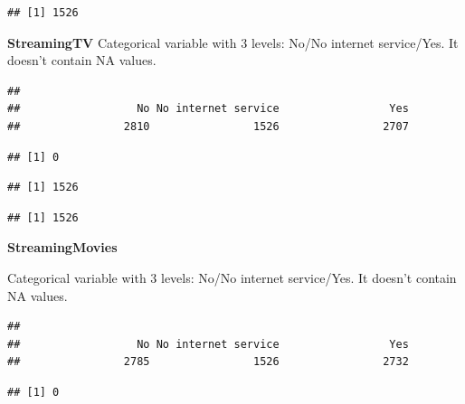 \documentclass[
  twoside]{article}
\newenvironment{Shaded}{\begin{snugshade}}{\end{snugshade}}
\newcommand{\CommentTok}[1]{\textcolor[rgb]{0.56,0.35,0.01}{\textit{#1}}}
\newcommand{\FunctionTok}[1]{\textcolor[rgb]{0.13,0.29,0.53}{\textbf{#1}}}
\newcommand{\NormalTok}[1]{#1}
\newcommand{\SpecialCharTok}[1]{\textcolor[rgb]{0.81,0.36,0.00}{\textbf{#1}}}
\newcommand{\StringTok}[1]{\textcolor[rgb]{0.31,0.60,0.02}{#1}}
\begin{document}
\begin{verbatim}
## [1] 1526
\end{verbatim}

\textbf{StreamingTV} Categorical variable with 3 levels: No/No internet
service/Yes. It doesn't contain NA values.

\begin{verbatim}
## 
##                  No No internet service                 Yes 
##                2810                1526                2707
\end{verbatim}

\begin{verbatim}
## [1] 0
\end{verbatim}

\begin{Shaded}
\end{Shaded}

\begin{verbatim}
## [1] 1526
\end{verbatim}

\begin{Shaded}
\end{Shaded}

\begin{verbatim}
## [1] 1526
\end{verbatim}

\textbf{StreamingMovies}

Categorical variable with 3 levels: No/No internet service/Yes. It
doesn't contain NA values.

\begin{verbatim}
## 
##                  No No internet service                 Yes 
##                2785                1526                2732
\end{verbatim}

\begin{verbatim}
## [1] 0
\end{verbatim}
\end{document}
